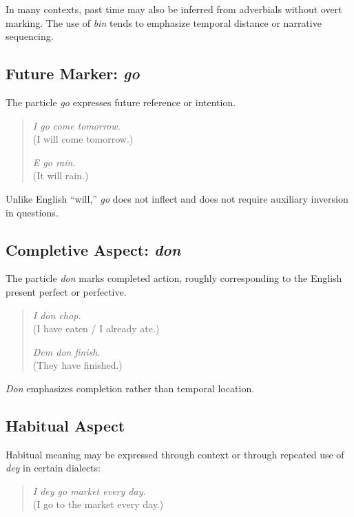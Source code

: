 \documentclass[12pt]{article}
\begin{document}
In many contexts, past time may also be inferred from adverbials without overt marking. The use of \textit{bin} tends to emphasize temporal distance or narrative sequencing.

\subsection{Future Marker: \textit{go}}

The particle \textit{go} expresses future reference or intention.

\begin{quote}
\textit{I go come tomorrow.} \\
(I will come tomorrow.)

\textit{E go rain.} \\
(It will rain.)
\end{quote}

Unlike English “will,” \textit{go} does not inflect and does not require auxiliary inversion in questions.

\subsection{Completive Aspect: \textit{don}}

The particle \textit{don} marks completed action, roughly corresponding to the English present perfect or perfective.

\begin{quote}
\textit{I don chop.} \\
(I have eaten / I already ate.)

\textit{Dem don finish.} \\
(They have finished.)
\end{quote}

\textit{Don} emphasizes completion rather than temporal location.

\subsection{Habitual Aspect}

Habitual meaning may be expressed through context or through repeated use of \textit{dey} in certain dialects:

\begin{quote}
\textit{I dey go market every day.} \\
(I go to the market every day.)
\end{quote}
\end{document}
